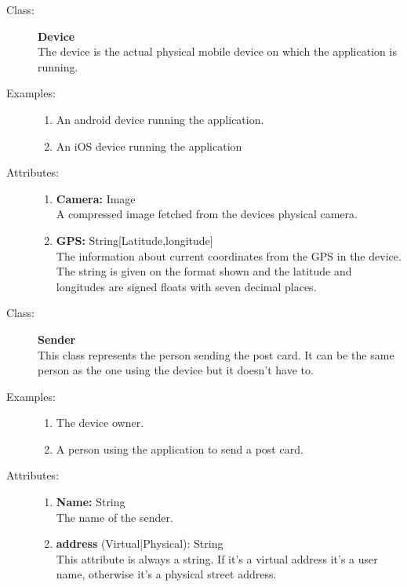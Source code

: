 \documentclass[10pt,a4paper]{article}
\begin{document}
\hrulefill

\begin{description}
\item[Class:] \textbf{Device} \hfill \\
The device is the actual physical mobile device on which the application is running.

\item[Examples:] \hfill
\begin{enumerate}
\item An android device running the application.
\item An iOS device running the application
\end{enumerate}

\item[Attributes:] \hfill
\begin{enumerate}
\item \textbf{Camera:} Image \hfill \\A compressed image fetched from the devices physical camera.
\item \textbf{GPS:} String[Latitude,longitude] \hfill \\The information about current coordinates from the GPS in the device. The string is given on the format shown and the latitude and longitudes are signed floats with seven decimal places.
\end{enumerate}
\end{description}

\hrulefill

\begin{description}
\item[Class:] \textbf{Sender} \hfill \\
This class represents the person sending the post card. It can be the same person as the one using the device but it doesn't have to.

\item[Examples:] \hfill
\begin{enumerate}
\item The device owner.
\item A person using the application to send a post card.
\end{enumerate}

\item[Attributes:] \hfill
\begin{enumerate}
\item \textbf{Name:} String \hfill \\The name of the sender. 
\item \textbf{address} (Virtual|Physical): String \hfill \\This attribute is always a string. If it's a virtual address it's a user name, otherwise it's a physical street address. 
\end{enumerate}
\end{description}
\end{document}
